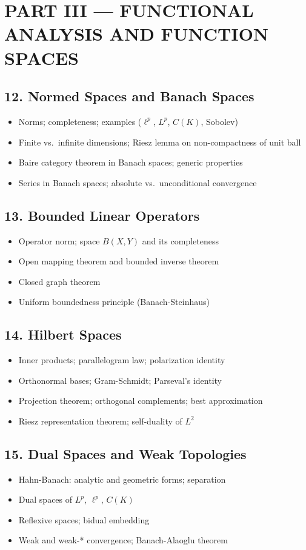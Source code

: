\section{PART III --- FUNCTIONAL ANALYSIS AND FUNCTION SPACES}

\subsection{12. Normed Spaces and Banach Spaces}
\begin{itemize}
\item Norms; completeness; examples ($\ell^p$, $L^p$, $C(K)$, Sobolev)
\item Finite vs.\ infinite dimensions; Riesz lemma on non-compactness of unit ball
\item Baire category theorem in Banach spaces; generic properties
\item Series in Banach spaces; absolute vs.\ unconditional convergence
\end{itemize}

\subsection{13. Bounded Linear Operators}
\begin{itemize}
\item Operator norm; space $B(X,Y)$ and its completeness
\item Open mapping theorem and bounded inverse theorem
\item Closed graph theorem
\item Uniform boundedness principle (Banach-Steinhaus)
\end{itemize}

\subsection{14. Hilbert Spaces}
\begin{itemize}
\item Inner products; parallelogram law; polarization identity
\item Orthonormal bases; Gram-Schmidt; Parseval's identity
\item Projection theorem; orthogonal complements; best approximation
\item Riesz representation theorem; self-duality of $L^2$
\end{itemize}

\subsection{15. Dual Spaces and Weak Topologies}
\begin{itemize}
\item Hahn-Banach: analytic and geometric forms; separation
\item Dual spaces of $L^p$, $\ell^p$, $C(K)$
\item Reflexive spaces; bidual embedding
\item Weak and weak-* convergence; Banach-Alaoglu theorem
\end{itemize}

